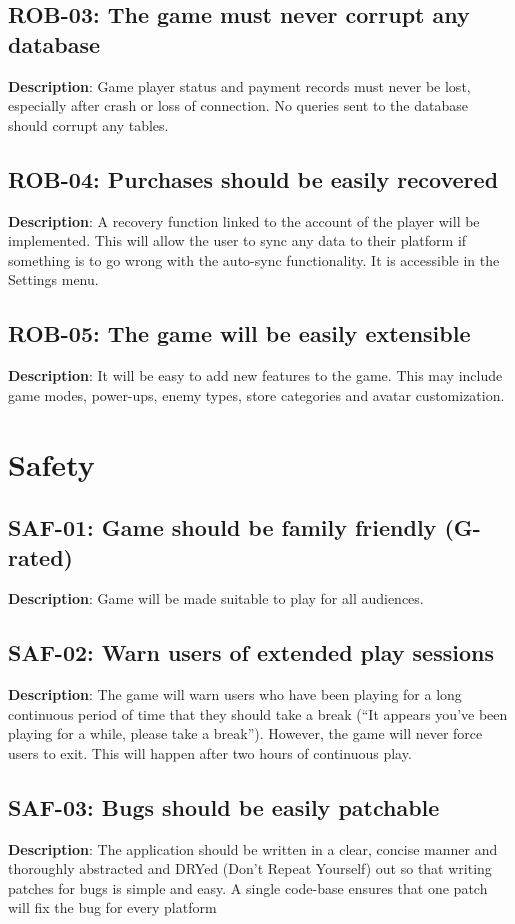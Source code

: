 \subsection{ROB-03: The game must never corrupt any database}
\textbf{Description}: Game player status and payment records must never be
lost, especially after crash or loss of connection. No queries sent
to the database should corrupt any tables.

\subsection{ROB-04: Purchases should be easily recovered}
\textbf{Description}: A recovery function linked to the account of the player
will be implemented. This will allow the user to sync any data to
their platform if something is to go wrong with the auto-sync functionality.
It is accessible in the Settings menu.

\subsection{ROB-05: The game will be easily extensible}
\textbf{Description}: It will be easy to add new features to the game. This
may include game modes, power-ups, enemy types, store categories and
avatar customization.

\section{Safety}

\subsection{SAF-01: Game should be family friendly (G-rated)}
\textbf{Description}: Game will be made suitable to play for all audiences.

\subsection{SAF-02: Warn users of extended play sessions}
\textbf{Description}: The game will warn users who have been playing for a
long continuous period of time that they should take a break (\textquotedblleft{}It
appears you\textquoteright{}ve been playing for a while, please take
a break\textquotedblright{}). However, the game will never force users
to exit. This will happen after two hours of continuous play.

\subsection{SAF-03: Bugs should be easily patchable}
\textbf{Description}: The application should be written in a clear, concise
manner and thoroughly abstracted and DRYed (Don\textquoteright{}t
Repeat Yourself) out so that writing patches for bugs is simple and
easy. A single code-base ensures that one patch will fix the bug for
every platform


